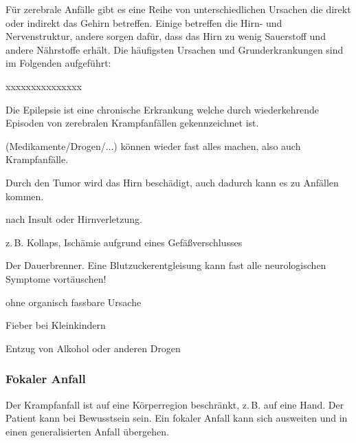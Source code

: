 {%
Für zerebrale Anfälle gibt es eine Reihe von unterschiedlichen Ursachen die
direkt oder indirekt das Gehirn betreffen. Einige betreffen die Hirn- und
Nervenstruktur, andere sorgen dafür, dass das Hirn zu wenig
Sauerstoff und andere Nährstoffe erhält. Die häufigsten Ursachen und
Grunderkrankungen sind im Folgenden aufgeführt: 

\begin{labeling}{xxxxxxxxxxxxxxx}
  \item[Epilepsie] Die Epilepsie ist eine chronische Erkrankung welche durch wiederkehrende
  Episoden von zerebralen Krampfanfällen gekennzeichnet ist.
  \item[Vergiftungen] (Medikamente/Drogen/...) können wieder fast alles machen,
  also auch Krampfanfälle. \cite{Supady2009}
  \item[Hirntumor] Durch den Tumor wird das Hirn beschädigt, auch dadurch kann es
  zu Anfällen kommen.
  \item[Narbengewebe] nach Insult oder Hirnverletzung.
  \item[Hirnblutung]
  \item[Sauerstoffmangel] z.\,B. Kollaps, Ischämie aufgrund eines Gefäßverschlusses
  \item[BZ] Der Dauerbrenner. Eine Blutzuckerentgleisung kann fast alle
  neurologischen Symptome vortäuschen!
  \item[angeboren] ohne organisch fassbare  Ursache
  \item[Fieberkrampf] Fieber bei Kleinkindern
  \item[Infektionen]
  \item[Entzug] Entzug von Alkohol oder anderen Drogen
\end{labeling}
}{
}{}{}{}






\subsubsection{Fokaler Anfall}
\label{topic:krampfanfall-fokaler}
Der Krampfanfall ist auf eine Körperregion beschränkt, z.\,B.
auf eine Hand. Der Patient kann bei Bewusstsein sein. Ein
fokaler Anfall kann sich ausweiten und in einen
generalisierten Anfall übergehen. 

      



